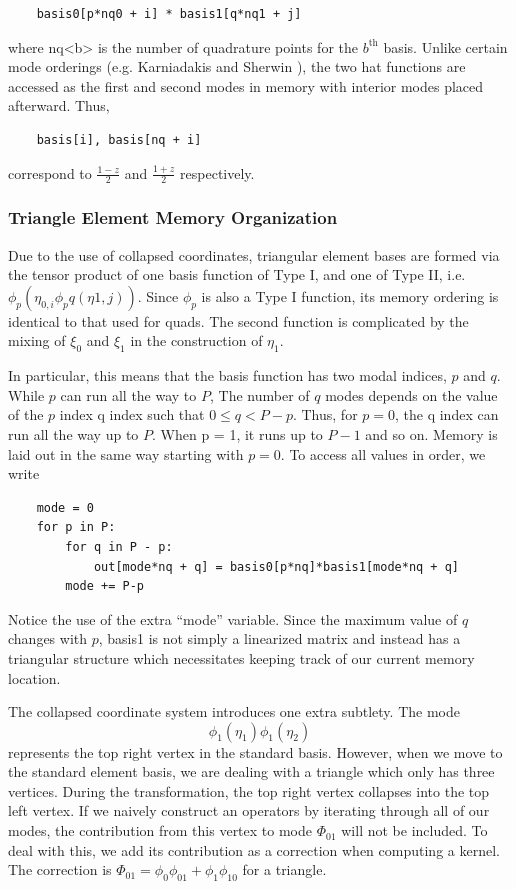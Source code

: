 \begin{lstlisting}
    basis0[p*nq0 + i] * basis1[q*nq1 + j]
\end{lstlisting}
where nq<b> is the number of quadrature points for the $b^{\text{th}}$ basis. Unlike certain mode orderings (e.g. Karniadakis and Sherwin \cite{KaSh05}), the two hat functions are accessed as the first and second modes in memory with interior modes placed afterward. Thus,
\begin{lstlisting}
    basis[i], basis[nq + i]
\end{lstlisting}
correspond to $\frac{1 - z}{2}$ and $\frac{1 + z}{2}$ respectively.

\subsubsection{Triangle Element Memory Organization}
Due to the use of collapsed coordinates, triangular element bases are formed via the tensor product of one basis function of Type I, and one of Type II, i.e. $\phi_p(\eta_{0,i} \phi_pq(\eta{1,j}))$. Since $\phi_p$ is also a Type I function, its memory ordering is identical to that used for quads. The second function is complicated by the mixing of $\xi_0$ and $\xi_1$ in the construction of $\eta_1$.

In particular, this means that the basis function has two modal indices, $p$ and $q$. While $p$ can run all the way to $P$, The number of $q$ modes depends on the value of the $p$ index q index such that $0 \leq q < P - p$. Thus, for $p = 0$, the q index can run all the way up to $P$. When p = 1, it runs up to $P - 1$ and so on. Memory is laid out in the same way starting with $p=0$. To access all values in order, we write
\begin{lstlisting}
    mode = 0
    for p in P:
        for q in P - p:
            out[mode*nq + q] = basis0[p*nq]*basis1[mode*nq + q]
        mode += P-p
\end{lstlisting}
Notice the use of the extra ``mode'' variable. Since the maximum value of $q$ changes with $p$, basis1 is not simply a linearized matrix and instead has a triangular structure which necessitates keeping track of our current memory location.

The collapsed coordinate system introduces one extra subtlety. The mode
\[
    \phi_1(\eta_1) \phi_1(\eta_2)
\]
represents the top right vertex in the standard basis. However, when we move to the standard element basis, we are dealing with a triangle which only has three vertices. During the transformation, the top right vertex collapses into the top left vertex. If we naively construct an operators by iterating through all of our modes, the contribution from this vertex to mode $\Phi_{01}$ will not be included. To deal with this, we add its contribution as a correction when computing a kernel. The correction is $\Phi_{01} = \phi_0 \phi_{01} + \phi_1 \phi_{10}$ for a triangle.

